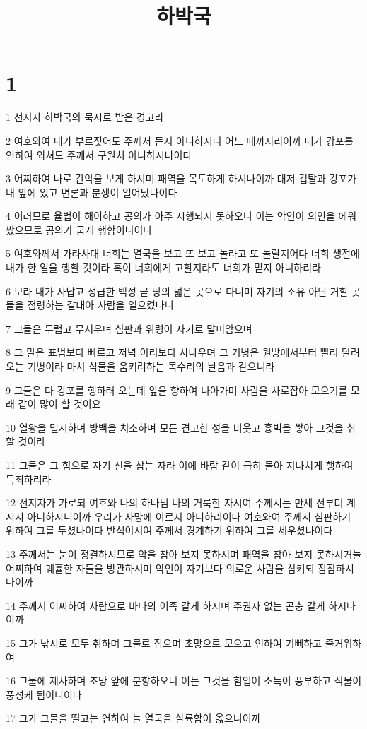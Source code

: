 

\title{하박국}


\chapter{1}

\par 1 선지자 하박국의 묵시로 받은 경고라
\par 2 여호와여 내가 부르짖어도 주께서 듣지 아니하시니 어느 때까지리이까 내가 강포를 인하여 외쳐도 주께서 구원치 아니하시나이다
\par 3 어찌하여 나로 간악을 보게 하시며 패역을 목도하게 하시나이까 대저 겁탈과 강포가 내 앞에 있고 변론과 분쟁이 일어났나이다
\par 4 이러므로 율법이 해이하고 공의가 아주 시행되지 못하오니 이는 악인이 의인을 에워쌌으므로 공의가 굽게 행함이니이다
\par 5 여호와께서 가라사대 너희는 열국을 보고 또 보고 놀라고 또 놀랄지어다 너희 생전에 내가 한 일을 행할 것이라 혹이 너희에게 고할지라도 너희가 믿지 아니하리라
\par 6 보라 내가 사납고 성급한 백성 곧 땅의 넓은 곳으로 다니며 자기의 소유 아닌 거할 곳들을 점령하는 갈대아 사람을 일으켰나니
\par 7 그들은 두렵고 무서우며 심판과 위령이 자기로 말미암으며
\par 8 그 말은 표범보다 빠르고 저녁 이리보다 사나우며 그 기병은 원방에서부터 빨리 달려오는 기병이라 마치 식물을 움키려하는 독수리의 날음과 같으니라
\par 9 그들은 다 강포를 행하러 오는데 앞을 향하여 나아가며 사람을 사로잡아 모으기를 모래 같이 많이 할 것이요
\par 10 열왕을 멸시하며 방백을 치소하며 모든 견고한 성을 비웃고 흉벽을 쌓아 그것을 취할 것이라
\par 11 그들은 그 힘으로 자기 신을 삼는 자라 이에 바람 같이 급히 몰아 지나치게 행하여 득죄하리라
\par 12 선지자가 가로되 여호와 나의 하나님 나의 거룩한 자시여 주께서는 만세 전부터 계시지 아니하시니이까 우리가 사망에 이르지 아니하리이다 여호와여 주께서 심판하기 위하여 그를 두셨나이다 반석이시여 주께서 경계하기 위하여 그를 세우셨나이다
\par 13 주께서는 눈이 정결하시므로 악을 참아 보지 못하시며 패역을 참아 보지 못하시거늘 어찌하여 궤휼한 자들을 방관하시며 악인이 자기보다 의로운 사람을 삼키되 잠잠하시나이까
\par 14 주께서 어찌하여 사람으로 바다의 어족 같게 하시며 주권자 없는 곤충 같게 하시나이까
\par 15 그가 낚시로 모두 취하며 그물로 잡으며 초망으로 모으고 인하여 기뻐하고 즐거워하여
\par 16 그물에 제사하며 초망 앞에 분향하오니 이는 그것을 힘입어 소득이 풍부하고 식물이 풍성케 됨이니이다
\par 17 그가 그물을 떨고는 연하여 늘 열국을 살륙함이 옳으니이까

